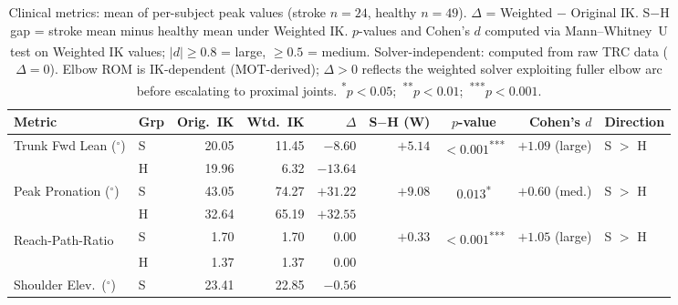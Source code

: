 \documentclass[journal,10pt,twocolumn]{IEEEtran}
\begin{document}
\begin{table}[t]
  \centering
  \caption{Clinical metrics: mean of per-subject peak values (stroke $n{=}24$,
           healthy $n{=}49$). $\Delta$ = Weighted $-$ Original IK.
           S$-$H gap = stroke mean minus healthy mean under Weighted IK.
           $p$-values and Cohen's $d$ computed via Mann--Whitney~U test on
           Weighted IK values; $|d|{\geq}0.8$ = large, ${\geq}0.5$ = medium.
           \textsuperscript{\dag}Solver-independent: computed from raw TRC data
           ($\Delta{=}0$). Elbow ROM is IK-dependent (MOT-derived);
           $\Delta{>}0$ reflects the weighted solver exploiting fuller
           elbow arc before escalating to proximal joints.
           \textsuperscript{*}$p{<}0.05$;\
           \textsuperscript{**}$p{<}0.01$;\
           \textsuperscript{***}$p{<}0.001$.}
  \label{tab:clinical}
  \setlength{\tabcolsep}{4pt}
  \renewcommand{\arraystretch}{1.1}
  {\small
  \begin{tabular}{llrrrrcrl}
    \toprule
    \textbf{Metric} & \textbf{Grp}
      & \textbf{Orig.\ IK} & \textbf{Wtd.\ IK}
      & \textbf{$\Delta$}
      & \textbf{S$-$H (W)}
      & \textbf{$p$-value}
      & \textbf{Cohen's $d$}
      & \textbf{Direction} \\
    \midrule
    Trunk Fwd Lean ($^{\circ}$)
      & S  & 20.05 & 11.45 & $-8.60$
      & \multirow{2}{*}{$+5.14$}
      & \multirow{2}{*}{$<0.001$\textsuperscript{***}}
      & \multirow{2}{*}{$+1.09$ \scriptsize{(large)}}
      & \multirow{2}{*}{S $>$ H \checkmark} \\
      & H  & 19.96 &  6.32 & $-13.64$ & & & & \\
    \midrule
    Peak Pronation ($^{\circ}$)
      & S  & 43.05 & 74.27 & $+31.22$
      & \multirow{2}{*}{$+9.08$}
      & \multirow{2}{*}{$0.013$\textsuperscript{*}}
      & \multirow{2}{*}{$+0.60$ \scriptsize{(med.)}}
      & \multirow{2}{*}{S $>$ H \checkmark} \\
      & H  & 32.64 & 65.19 & $+32.55$ & & & & \\
    \midrule
    Reach-Path-Ratio\textsuperscript{\dag}
      & S  & 1.70 & 1.70 & $0.00$
      & \multirow{2}{*}{$+0.33$}
      & \multirow{2}{*}{$<0.001$\textsuperscript{***}}
      & \multirow{2}{*}{$+1.05$ \scriptsize{(large)}}
      & \multirow{2}{*}{S $>$ H \checkmark} \\
      & H  & 1.37 & 1.37 & $0.00$ & & & & \\
    \midrule
    Shoulder Elev.\ ($^{\circ}$)
      & S  & 23.41 & 22.85 & $-0.56$

\end{tabular}}
\end{table}
\end{document}
